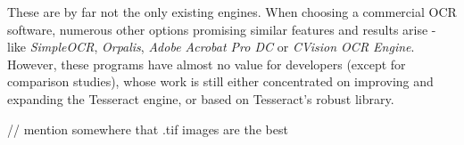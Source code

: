 These are by far not the only existing engines. When choosing a commercial OCR software, numerous other options promising similar features and results arise - like \emph{SimpleOCR}, \emph{Orpalis}, \emph{Adobe Acrobat Pro DC} or \emph{CVision OCR Engine}. However, these programs have almost no value for developers (except for comparison studies), whose work is still either concentrated on improving and expanding the Tesseract engine, or based on Tesseract's robust library.

// mention somewhere that .tif images are the best 
